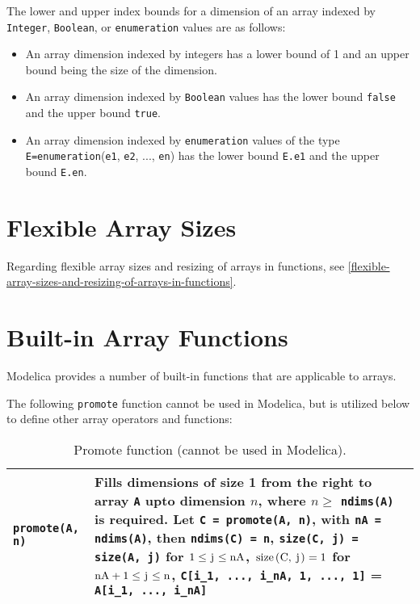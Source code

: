 The lower and upper index bounds for a dimension of an array indexed by
\lstinline!Integer!, \lstinline!Boolean!, or \lstinline!enumeration! values are as follows:
\begin{itemize}
\item
  An array dimension indexed by integers has a lower bound of 1 and an
  upper bound being the size of the dimension.
\item
  An array dimension indexed by \lstinline!Boolean! values has the lower bound \lstinline!false!
  and the upper bound \lstinline!true!.
\item
  An array dimension indexed by \lstinline!enumeration! values of the type
  \lstinline!E=enumeration!(\lstinline!e1!, \lstinline!e2!, ..., \lstinline!en!) has the lower bound \lstinline!E.e1! and the upper
  bound \lstinline!E.en!.
\end{itemize}

\section{Flexible Array Sizes}

Regarding flexible array sizes and resizing of arrays in functions, see
\autoref{flexible-array-sizes-and-resizing-of-arrays-in-functions}.

\section{Built-in Array Functions}

Modelica provides a number of built-in functions that are applicable to
arrays.

The following \lstinline!promote! function cannot be used in Modelica, but is
utilized below to define other array operators and functions:
\begin{longtable}[]{|l|p{9cm}|}
\caption{Promote function (cannot be used in Modelica).}\\
\hline \endhead
\lstinline!promote(A, n)! & Fills dimensions of size 1 from the right to array \lstinline!A! upto
dimension $n$, where $n \geq$ \lstinline!ndims(A)! is required. Let \lstinline!C = promote(A, n)!, with \lstinline!nA = ndims(A)!, then \lstinline!ndims(C) = n!, \lstinline!size(C, j) = size(A, j)! for $1 \leq \text{\lstinline!j!} \leq \text{\lstinline!nA!}$, $\text{\lstinline!size(C, j)!} = 1$ for $\text{\lstinline!nA!} + 1 \leq \text{\lstinline!j!} \leq \text{\lstinline!n!}$, \lstinline!C[i_1, ..., i_nA, 1, ..., 1]! = \lstinline!A[i_1, ..., i_nA]!\\ \hline
\end{longtable}

